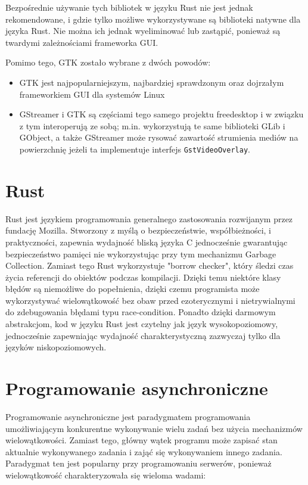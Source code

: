 Bezpośrednie używanie tych bibliotek w języku Rust nie jest jednak rekomendowane, i gdzie tylko
możliwe wykorzystywane są biblioteki natywne dla języka Rust. Nie można ich jednak wyeliminować lub
zastąpić, ponieważ są twardymi zależnościami frameworka GUI.

Pomimo tego, GTK zostało wybrane z dwóch powodów:

\begin{itemize}
    \item GTK jest najpopularniejszym, najbardziej sprawdzonym oraz dojrzałym frameworkiem GUI dla
          systemów Linux
    \item GStreamer i GTK są częściami tego samego projektu freedesktop i w związku z tym
          interoperują ze sobą; m.in. wykorzystują te same biblioteki GLib i GObject, a także
          GStreamer może rysować zawartość strumienia mediów na powierzchnię jeżeli ta implementuje
          interfejs \verb|GstVideoOverlay|.
\end{itemize}

\section{Rust}

Rust jest językiem programowania generalnego zastosowania rozwijanym przez fundację Mozilla.
Stworzony z myślą o bezpieczeństwie, współbieżności, i praktyczności, zapewnia wydajność bliską
języka C jednocześnie gwarantując bezpieczeństwo pamięci nie wykorzystując przy tym mechanizmu
Garbage Collection. Zamiast tego Rust wykorzystuje "borrow checker", który śledzi czas życia
referencji do obiektów podczas kompilacji. Dzięki temu niektóre klasy błędów są niemożliwe do
popełnienia, dzięki czemu programista może wykorzystywać wielowątkowość bez obaw przed ezoterycznymi
i nietrywialnymi do zdebugowania błędami typu race-condition. Ponadto dzięki darmowym abstrakcjom,
kod w języku Rust jest czytelny jak język wysokopoziomowy, jednocześnie zapewniając wydajność
charakterystyczną zazwyczaj tylko dla języków niskopoziomowych.

\section{Programowanie asynchroniczne}

Programowanie asynchroniczne jest paradygmatem programowania umożliwiającym konkurentne wykonywanie
wielu zadań bez użycia mechanizmów wielowątkowości. Zamiast tego, główny wątek programu może zapisać
stan aktualnie wykonywanego zadania i zająć się wykonywaniem innego zadania. Paradygmat ten
jest popularny przy programowaniu serwerów, ponieważ wielowątkowość charakteryzowała się wieloma
wadami:

